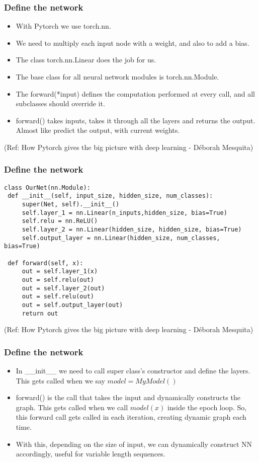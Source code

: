\begin{frame}[fragile] \frametitle{Define the network}
\begin{itemize}
\item With Pytorch we use torch.nn. 
\item We need to multiply each input node with a weight, and also to add a bias. 
\item The class torch.nn.Linear does the job for us.
\item The base class for all neural network modules is torch.nn.Module.
\item The forward(*input) defines the computation performed at every call, and all subclasses should override it.
\item forward() takes inputs, takes it through all the layers and returns the output. Almost like predict the output, with current weights.
\end{itemize}

  {\tiny (Ref: How Pytorch gives the big picture with deep learning - Déborah Mesquita)}
\end{frame}


\begin{frame}[fragile] \frametitle{Define the network}
 \begin{lstlisting}
class OurNet(nn.Module):
 def __init__(self, input_size, hidden_size, num_classes):
     super(Net, self).__init__()
     self.layer_1 = nn.Linear(n_inputs,hidden_size, bias=True)
     self.relu = nn.ReLU()
     self.layer_2 = nn.Linear(hidden_size, hidden_size, bias=True)
     self.output_layer = nn.Linear(hidden_size, num_classes, bias=True)
 
 def forward(self, x):
     out = self.layer_1(x)
     out = self.relu(out)
     out = self.layer_2(out)
     out = self.relu(out)
     out = self.output_layer(out)
     return out
\end{lstlisting}

  {\tiny (Ref: How Pytorch gives the big picture with deep learning - Déborah Mesquita)}
\end{frame}

\begin{frame}[fragile] \frametitle{Define the network}
\begin{itemize}
\item In \_\_init\_\_ we need to call super class's constructor and define the layers. This gets called when we say $model = MyModel()$
\item forward() is the call that takes the input and dynamically constructs the graph. This gets called when we call $model(x)$ inside the epoch loop. So, this forward call gets called in each iteration, creating dynamic graph each time.
\item With this, depending on the size of input, we can dynamically construct NN accordingly, useful for variable length sequences.
\end{itemize}

\end{frame}


